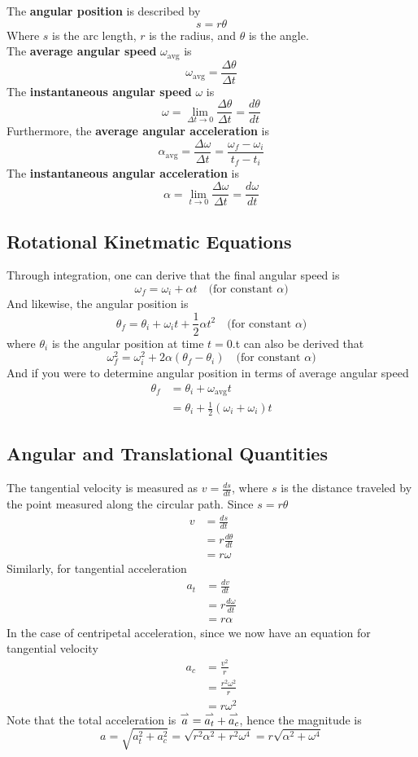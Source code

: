 The \textbf{angular position} is described by
\[
    s=r\theta
\]
Where $s$ is the arc length, $r$ is the radius, and $\theta$ is the angle.\\

The \textbf{average angular speed} $\omega_\text{avg}$ is
\[
    \omega_\text{avg}=\frac{\Delta\theta}{\Delta t}
\]
The \textbf{instantaneous angular speed} $\omega$ is
\[
    \omega=\lim_{\Delta t\to0}\frac{\Delta\theta}{\Delta t}=\frac{d\theta}{dt}
\]
Furthermore, the \textbf{average angular acceleration} is
\[
    \alpha_\text{avg}=\frac{\Delta\omega}{\Delta t}=\frac{\omega_f-\omega_i}{t_f-t_i}
\]
The \textbf{instantaneous angular acceleration} is
\[
    \alpha=\lim_{t\to0}\frac{\Delta\omega}{\Delta t}=\frac{d\omega}{dt}
\]

\subsection{Rotational Kinetmatic Equations}
Through integration, one can derive that the final angular speed is
\[
    \omega_f=\omega_i+\alpha t\quad\text{(for constant $\alpha$)}
\]
And likewise, the angular position is
\[
    \theta_f=\theta_i+\omega_it+\frac{1}{2}\alpha t^2\quad\text{(for constant $\alpha$)}
\]
where $\theta_i$ is the angular position at time $t=0$.t can also be derived that
\[
    \omega_f^2=\omega_i^2+2\alpha(\theta_f-\theta_i)\quad\text{(for constant $\alpha$)}
\]
And if you were to determine angular position in terms of average angular speed
\begin{align*}
    \theta_f&=\theta_i+\omega_\text{avg}t\\
    &=\theta_i+\frac{1}{2}(\omega_i+\omega_i)t
\end{align*}

\subsection{Angular and Translational Quantities}
The tangential velocity is measured as $v=\frac{ds}{dt}$, where $s$ is the distance traveled by
the point measured along the circular path. Since $s=r\theta$
\begin{align*}
    v&=\frac{ds}{dt}\\
    &=r \frac{d\theta}{dt}\\
    &=r\omega
\end{align*}
Similarly, for tangential acceleration
\begin{align*}
    a_t&=\frac{dv}{dt}\\
    &=r\frac{d\omega}{dt}\\
    &=r\alpha
\end{align*}
In the case of centripetal acceleration, since we now have an equation for tangential velocity
\begin{align*}
    a_c&=\frac{v^2}{r}\\
    &=\frac{r^2\omega^2}{r}\\
    &=r\omega^2
\end{align*}
Note that the total acceleration is $\overset{\rightharpoonup}{a}=\overset{\rightharpoonup}{a_t}+\overset{\rightharpoonup}{a_c}$, hence the magnitude is
\[
    a=\sqrt{a_t^2+a_c^2}=\sqrt{r^2\alpha^2+r^2\omega^4}=r \sqrt{\alpha^2+\omega^4}
\]